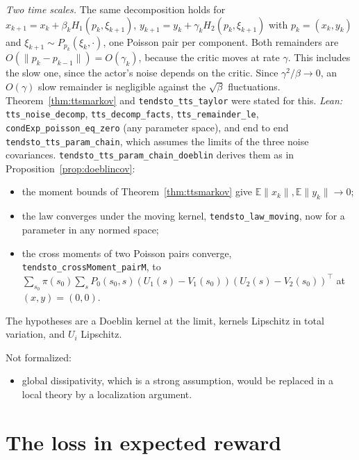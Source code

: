 \documentclass[11pt]{article}
\theoremstyle{definition}
\theoremstyle{remark}
\newcommand{\E}{\mathbb{E}}
\begin{document}
\noindent\emph{Two time scales.} The same decomposition holds for
$x_{k+1} = x_k + \beta_kH_1(p_k, \xi_{k+1})$, $y_{k+1} = y_k + \gamma_kH_2(p_k, \xi_{k+1})$ with $p_k = (x_k, y_k)$ and
$\xi_{k+1} \sim P_{p_k}(\xi_k, \cdot)$, one Poisson pair per component. Both remainders are
$O(\|p_k - p_{k-1}\|) = O(\gamma_k)$, because the critic moves at rate $\gamma$. This includes the slow one,
since the actor's noise depends on the critic. Since $\gamma^2/\beta \to 0$, an $O(\gamma)$ slow remainder is
negligible against the $\sqrt\beta$ fluctuations. Theorem~\ref{thm:ttsmarkov} and \texttt{tendsto\_tts\_taylor}
were stated for this. \emph{Lean:} \texttt{tts\_noise\_decomp}, \texttt{tts\_decomp\_facts},
\texttt{tts\_remainder\_le}, \texttt{condExp\_poisson\_eq\_zero} (any parameter space), and end to end
\texttt{tendsto\_tts\_param\_chain}, which assumes the limits of the three noise covariances.
\texttt{tendsto\_tts\_param\_chain\_doeblin} derives them as in Proposition~\ref{prop:doeblincov}:
\begin{itemize}
\item the moment bounds of Theorem~\ref{thm:ttsmarkov} give $\E\|x_k\|, \E\|y_k\| \to 0$;
\item the law converges under the moving kernel, \texttt{tendsto\_law\_moving}, now for a parameter in
  any normed space;
\item the cross moments of two Poisson pairs converge, \texttt{tendsto\_crossMoment\_pairM}, to
  $\sum_{s_0}\pi(s_0)\sum_sP_0(s_0, s)(U_1(s) - V_1(s_0))(U_2(s) - V_2(s_0))^\top$ at $(x, y) = (0, 0)$.
\end{itemize}
The hypotheses are a Doeblin kernel at the limit, kernels Lipschitz in total variation, and $U_i$
Lipschitz.

Not formalized:
\begin{itemize}
\item global dissipativity, which is a strong assumption, would be replaced in a local theory by a
  localization argument.
\end{itemize}

\section{The loss in expected reward}
\end{document}
